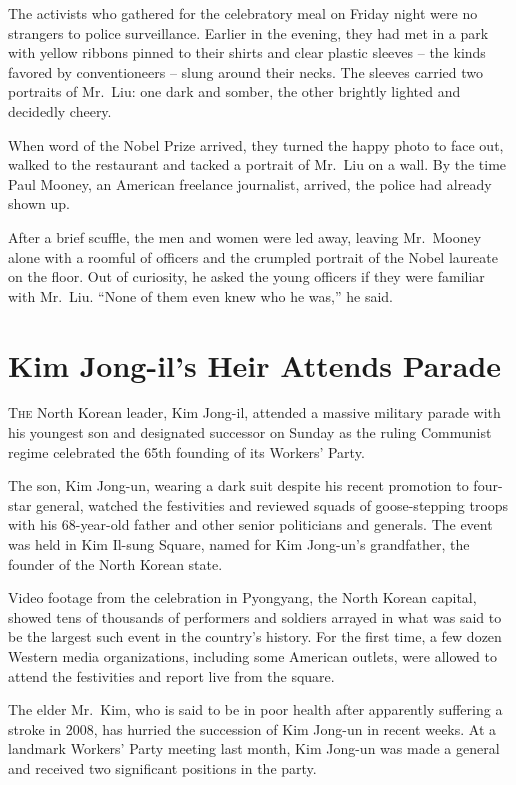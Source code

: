 ﻿\documentclass[12pt]{article}
\begin{document}
The activists who gathered for the celebratory meal on Friday night were no strangers to police
surveillance. Earlier in the evening, they had met in a park with yellow ribbons pinned to their
shirts and clear plastic sleeves -- the kinds favored by conventioneers -- slung around their necks.
The sleeves carried two portraits of Mr.~Liu: one dark and somber, the other brightly lighted and
decidedly cheery.

When word of the Nobel Prize arrived, they turned the happy photo to face out, walked to the
restaurant and tacked a portrait of Mr.~Liu on a wall. By the time Paul Mooney, an American
freelance journalist, arrived, the police had already shown up.

After a brief scuffle, the men and women were led away, leaving Mr.~Mooney alone with a roomful of
officers and the crumpled portrait of the Nobel laureate on the floor. Out of curiosity, he asked
the young officers if they were familiar with Mr.~Liu. ``None of them even knew who he was,'' he
said.

\section{Kim Jong-il's Heir Attends Parade}

\lettrine{T}{he} North Korean leader, Kim Jong-il, attended a massive
military parade with his youngest son and designated successor on Sunday as the ruling Communist
regime celebrated the 65th founding of its Workers' Party.

The son, Kim Jong-un, wearing a dark suit despite his recent promotion to four-star general, watched
the festivities and reviewed squads of goose-stepping troops with his 68-year-old father and other
senior politicians and generals. The event was held in Kim Il-sung Square, named for Kim Jong-un's
grandfather, the founder of the North Korean state.

Video footage from the celebration in Pyongyang, the North Korean capital, showed tens of thousands
of performers and soldiers arrayed in what was said to be the largest such event in the country's
history. For the first time, a few dozen Western media organizations, including some American
outlets, were allowed to attend the festivities and report live from the square.

The elder Mr.~Kim, who is said to be in poor health after apparently suffering a stroke in 2008, has
hurried the succession of Kim Jong-un in recent weeks. At a landmark Workers' Party meeting last
month, Kim Jong-un was made a general and received two significant positions in the party.
\end{document}
